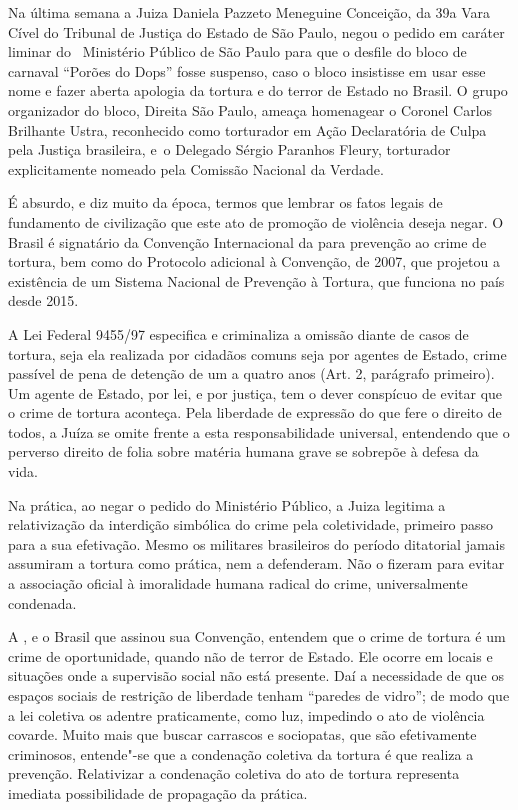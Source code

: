 Na última semana a Juiza Daniela Pazzeto Meneguine Conceição, da 39a
Vara Cível do Tribunal de Justiça do Estado de São Paulo, negou o pedido
em caráter liminar do~ Ministério Público de São Paulo para que o
desfile do bloco de carnaval ``Porões do Dops'' fosse suspenso, caso o
bloco insistisse em usar esse nome e fazer aberta apologia da tortura e
do terror de Estado no Brasil. O grupo organizador do bloco, Direita
São Paulo, ameaça homenagear o Coronel Carlos Brilhante Ustra, reconhecido
como torturador em Ação Declaratória de Culpa pela Justiça brasileira,
e~o Delegado Sérgio Paranhos Fleury, torturador explicitamente nomeado
pela Comissão Nacional da Verdade.

É absurdo, e diz muito da época, termos que lembrar os fatos legais de
fundamento de civilização que este ato de promoção de violência deseja
negar. O Brasil é signatário da Convenção Internacional da  para
prevenção ao crime de tortura, bem como do Protocolo adicional à
Convenção, de 2007, que projetou a existência de um Sistema Nacional de
Prevenção à Tortura, que funciona no país desde 2015.

A Lei Federal 9455/97 especifica e criminaliza a omissão diante de casos
de tortura, seja ela realizada por cidadãos comuns seja por agentes de
Estado, crime passível de pena de detenção de um a quatro anos (Art. 2,
parágrafo primeiro). Um agente de Estado, por lei, e por justiça, tem o
dever conspícuo de evitar que o crime de tortura aconteça. Pela
liberdade de expressão do que fere o direito de todos, a Juíza se omite
frente a esta responsabilidade universal, entendendo que o perverso
direito de folia sobre matéria humana grave se sobrepõe à defesa da
vida.

Na prática, ao negar o pedido do Ministério Público, a Juiza legitima a
relativização da interdição simbólica do crime pela coletividade,
primeiro passo para a sua efetivação. Mesmo os militares brasileiros do
período ditatorial jamais assumiram a tortura como prática, nem a
defenderam. Não o fizeram para evitar a associação oficial à imoralidade
humana radical do crime, universalmente condenada.

A , e o Brasil que assinou sua Convenção, entendem que o crime de
tortura é um crime de oportunidade, quando não de terror de Estado. Ele
ocorre em locais e situações onde a supervisão social não está presente.
Daí a necessidade de que os espaços sociais de restrição de liberdade
tenham ``paredes de vidro''; de modo que a lei coletiva os adentre
praticamente, como luz, impedindo o ato de violência covarde. Muito mais
que buscar carrascos e sociopatas, que são efetivamente criminosos,
entende"-se que a condenação coletiva da tortura é que realiza a
prevenção. Relativizar a condenação coletiva do ato de tortura
representa imediata possibilidade de propagação da prática.

